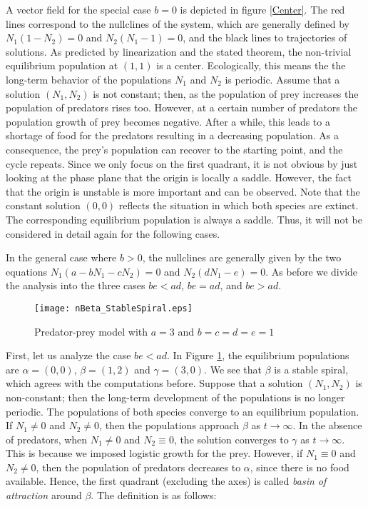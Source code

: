 \documentclass[11pt,a4paper]{scrartcl}
\theoremstyle{definition}
\begin{document}
A vector field for the special case $b=0$ is depicted in figure \ref{Center}. The red lines correspond to the nullclines of the system, which are generally defined by $N_1(1-N_2)=0$ and $N_2(N_1-1)=0$, and the black lines to trajectories of solutions. As predicted by linearization and the stated theorem, the non-trivial equilibrium population at $(1,1)$ is a center. Ecologically, this means the the long-term behavior of the populations $N_1$ and $N_2$ is periodic. Assume that a solution $(N_1,N_2)$ is not constant; then, as the population of prey increases the population of predators rises too. However, at a certain number of predators the population growth of prey becomes negative. After a while, this leads to a shortage of food for the predators resulting in a decreasing population. As a consequence, the prey's population can recover to the starting point, and the cycle repeats. Since we only focus on the first quadrant, it is not obvious by just looking at the phase plane that the origin is locally a saddle. However, the fact that the origin is unstable is more important and can be observed. Note that the constant solution $(0,0)$ reflects the situation in which both species are extinct. The corresponding equilibrium population is always a saddle. Thus, it will not be considered in detail again for the following cases. 
\newline

In the general case where $b>0$, the nullclines are generally given by the two equations $N_1(a-bN_1-cN_2)=0$ and $N_2(dN_1-e)=0$. As before we divide the analysis into the three cases $be<ad$, $be=ad$, and $be>ad$. 

\begin{figure}[h]
	\centering
	\texttt{[image: nBeta\_StableSpiral.eps]}
	\caption{Predator-prey model with $a=3$ and $b=c=d=e=1$}
	\label{fig2}
\end{figure}
\FloatBarrier

First, let us analyze the case $be<ad$. In Figure \ref{fig2}, the equilibrium populations are $\alpha=(0,0)$, $\beta=(1,2)$ and $\gamma=(3,0)$. We see that $\beta$ is a stable spiral, which agrees with the computations before. Suppose that a solution $(N_1,N_2)$ is non-constant; then the long-term development of the populations is no longer periodic. The populations of both species converge to an equilibrium population. If $N_1 \neq 0$ and $N_2 \neq 0$, then the populations approach $\beta$ as $t \rightarrow \infty$. In the absence of predators, when $N_1 \neq 0$ and $N_2 \equiv 0$, the solution converges to $\gamma$ as $t \rightarrow \infty$. This is because we imposed logistic growth for the prey. However, if $N_1 \equiv 0$ and $N_2 \neq 0$, then the population of predators decreases to $\alpha$, since there is no food available. Hence, the first quadrant (excluding the axes) is called \textit{basin of attraction} around $\beta$. The definition is as follows:
\end{document}
